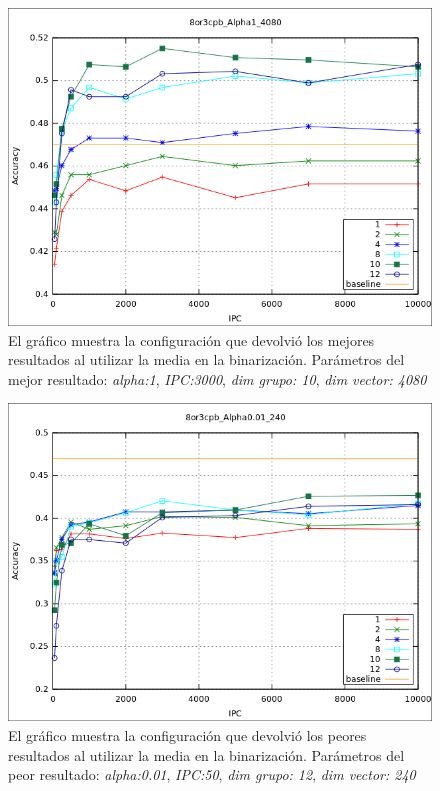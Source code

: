 			\begin{figure}[htbp]
				\centering
				\includegraphics[scale=0.6]{img/resultados/sinteticas/best_media_8or3cpb_Alpha1_4080.png}
				\caption[Sintéticas media mejor resultado]{El gráfico muestra la configuración que devolvió los mejores resultados al utilizar la media en la binarización. Parámetros del mejor resultado: \textit{alpha:1}, \textit{IPC:3000}, \textit{dim grupo: 10}, \textit{dim vector: 4080}}
				\label{fig: Sinteticas-media-mejor}
			\end{figure}
			
			\begin{figure}[htbp]
				\centering
				\includegraphics[scale=0.6]{img/resultados/sinteticas/worst_media_8or3cpb_Alpha0,01_240.png}
				\caption[Sintéticas media bajo resultado]{El gráfico muestra la configuración que devolvió los peores resultados al utilizar la media en la binarización. Parámetros del peor resultado: \textit{alpha:0.01}, \textit{IPC:50}, \textit{dim grupo: 12}, \textit{dim vector: 240}}
				\label{fig: Sinteticas-media-bajo}
			\end{figure}
			
